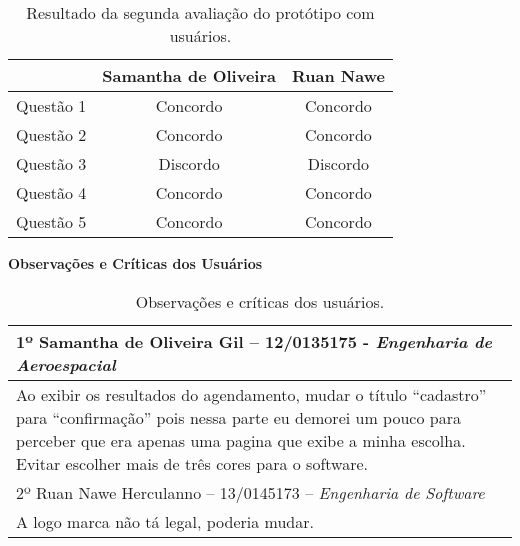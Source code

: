 			\begin{table}[h]
				\centering 
				\begin{tabular}{|c|c|c|}

					\hline

					& Samantha de Oliveira & Ruan Nawe \\
					
					\hline
					
					Questão 1 & Concordo & Concordo \\
					
					Questão 2 & Concordo & Concordo \\
					
					Questão 3 & Discordo & Discordo \\

					Questão 4 & Concordo & Concordo \\

					Questão 5 & Concordo & Concordo \\

					\hline

				\end{tabular}
				\caption[Resultado da segunda avaliação do protótipo com usuários]{Resultado da segunda avaliação do protótipo com usuários.}
				\label{tab:segundaAvaliacao_tables}
			\end{table}

			\textbf{Observações e Críticas dos Usuários}


			\begin{table}[h]
				\centering 
				\begin{tabular}{|p{13cm}|}

					\hline

					1º Samantha de Oliveira Gil – 12/0135175 -  \emph{Engenharia de Aeroespacial} \\
					
					\hline
					
					Ao exibir os resultados do agendamento, mudar o título “cadastro” para “confirmação” pois nessa parte eu demorei um pouco para perceber que era apenas uma pagina que exibe a minha escolha. Evitar escolher mais de três cores para o software. \\

					\hline

					2º Ruan Nawe Herculanno – 13/0145173 –  \emph{Engenharia de Software} \\
					
					\hline
					
					A logo marca não tá legal, poderia mudar. \\

					\hline

				\end{tabular}
				\caption[Observações e críticas dos usuários]{Observações e críticas dos usuários.}
				\label{tab:segundaAvaliacao_tables}
			\end{table}

